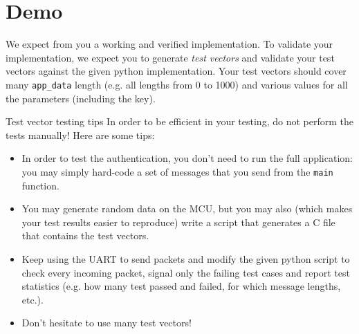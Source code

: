 
\section{Demo}

We expect from you a working and verified implementation.
To validate your implementation, we expect you to generate \emph{test vectors}
and validate your test vectors against the given python implementation.
Your test vectors should cover many \texttt{app\_data} length (e.g. all lengths
from 0 to 1000) and various values for all the parameters (including the key).

\begin{bclogo}[couleur = gray!20, arrondi = 0.2, logo=\bcinfo]{Test vector testing tips}
In order to be efficient in your testing, do not perform the tests manually! Here are some tips:
\begin{itemize}
    \item In order to test the authentication, you don't need to run the full
        application: you may simply hard-code a set of messages that you send
        from the \texttt{main} function.
    \item You may generate random data on the MCU, but you may also (which
        makes your test results easier to reproduce) write a script that
        generates a C file that contains the test vectors.
    \item Keep using the UART to send packets and modify the given python
        script to check every incoming packet, signal only the failing test
        cases and report test statistics (e.g. how many test passed and failed,
        for which message lengths, etc.).
    \item Don't hesitate to use many test vectors! 
\end{itemize}
\end{bclogo}
